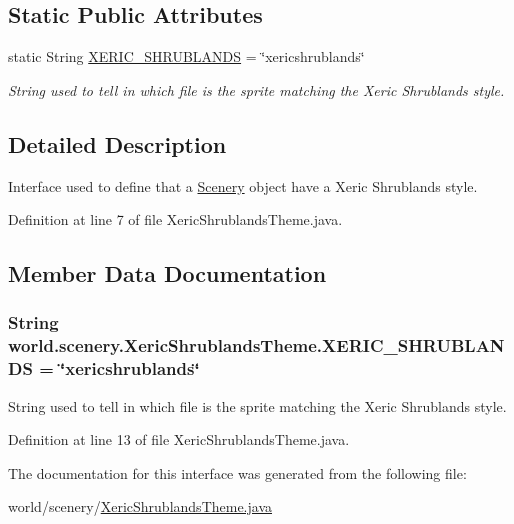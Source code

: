 \subsection*{Static Public Attributes}
\begin{DoxyCompactItemize}
\item 
static String \hyperlink{a00040_a03cab029cbad9fdfa722122d3393c06c}{X\-E\-R\-I\-C\-\_\-\-S\-H\-R\-U\-B\-L\-A\-N\-D\-S} = \char`\"{}xericshrublands\char`\"{}
\begin{DoxyCompactList}\small\item\em String used to tell in which file is the sprite matching the Xeric Shrublands style. \end{DoxyCompactList}\end{DoxyCompactItemize}


\subsection{Detailed Description}
Interface used to define that a \hyperlink{a00024}{Scenery} object have a Xeric Shrublands style. 

Definition at line 7 of file Xeric\-Shrublands\-Theme.\-java.



\subsection{Member Data Documentation}
\hypertarget{a00040_a03cab029cbad9fdfa722122d3393c06c}{
\subsubsection[{X\-E\-R\-I\-C\-\_\-\-S\-H\-R\-U\-B\-L\-A\-N\-D\-S}]{\setlength{\rightskip}{0pt plus 5cm}String world.\-scenery.\-Xeric\-Shrublands\-Theme.\-X\-E\-R\-I\-C\-\_\-\-S\-H\-R\-U\-B\-L\-A\-N\-D\-S = \char`\"{}xericshrublands\char`\"{}\hspace{0.3cm}{\ttfamily [static]}}}\label{a00040_a03cab029cbad9fdfa722122d3393c06c}


String used to tell in which file is the sprite matching the Xeric Shrublands style. 



Definition at line 13 of file Xeric\-Shrublands\-Theme.\-java.



The documentation for this interface was generated from the following file\-:\begin{DoxyCompactItemize}
\item 
world/scenery/\hyperlink{a00078}{Xeric\-Shrublands\-Theme.\-java}\end{DoxyCompactItemize}
